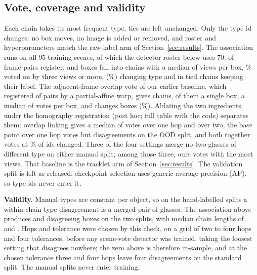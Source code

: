 \documentclass{article}
\begin{document}
\subsection{Vote, coverage and validity}
\label{sec:vote}
Each chain takes its most frequent type; ties are left unchanged. Only the type id changes: no box moves, no image is added or removed, and roster and hyperparameters match the raw-label arm of Section~\ref{sec:results}. The association runs on all 95 training scenes, of which the detector roster below uses 70: \SceneRegPairs{} of \SceneTriedPairs{} frame pairs register, and \ChainBoxes{} boxes fall into \SceneChains{} chains with a median of \SceneMedianLen{} views per box, \SceneBoxesGeThreePct\% voted on by three views or more, \SceneChanged{} (\SceneChangedPct\%) changing type and \SceneTied{} in tied chains keeping their label. The adjacent-frame overlap vote of our earlier baseline, which registered \ChainFramePairsReg{} of \AdjFramePairs{} pairs by a partial-affine warp, gives \TrkChains{} chains, \TrkSingletons{} of them a single box, a median of \TrkMedianVotes{} votes per box, and changes \TrkChanged{} boxes (\TrkChangedPct\%). Ablating the two ingredients under the homography registration (post hoc; full table with the code) separates them: overlap linking gives a median of \AblOvOneVotes{} votes over one hop and \AblOvTwoVotes{} over two, the base point over one hop \AblBaseOneVotes{} votes but \AblBaseOneOODDis{} disagreements on the OOD split, and both together \SceneMedianLen{} votes at \SceneChangedPct\% of ids changed. Three of the four settings merge no two glasses of different type on either manual split; among those three, ours votes with the most views. That baseline is the tracklet arm of Section~\ref{sec:results}. The validation split is left as released: checkpoint selection uses generic average precision (AP), so type ids never enter it.

\noindent\textbf{Validity.} Manual types are constant per object, so on the hand-labelled splits a within-chain type disagreement is a merged pair of glasses. The association above produces \ManualChainStd{} and \ManualChainOOD{} disagreeing boxes on the two splits, with median chain lengths of \ManualMedianStd{} and \ManualMedianOOD. Hops and tolerance were chosen by this check, on a grid of two to four hops and four tolerances, before any scene-vote detector was trained, taking the loosest setting that disagrees nowhere; the zero above is therefore in-sample, and at the chosen tolerance three and four hops leave four disagreements on the standard split. The manual splits never enter training.
\end{document}
